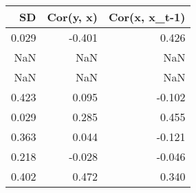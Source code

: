 \begin{tabular}{rrr}
\toprule
SD & Cor(y, x) & Cor(x, x_t-1) \\
\midrule
0.029 & -0.401 & 0.426 \\
NaN & NaN & NaN \\
NaN & NaN & NaN \\
0.423 & 0.095 & -0.102 \\
0.029 & 0.285 & 0.455 \\
0.363 & 0.044 & -0.121 \\
0.218 & -0.028 & -0.046 \\
0.402 & 0.472 & 0.340 \\
\bottomrule
\end{tabular}
